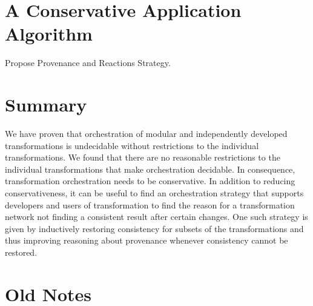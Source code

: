\section{A Conservative Application Algorithm}

Propose Provenance and Reactions Strategy.




\section{Summary}



\begin{insight}[Orchestration]
    We have proven that orchestration of modular and independently developed transformations is undecidable without restrictions to the individual transformations.
    We found that there are no reasonable restrictions to the individual transformations that make orchestration decidable.
    In consequence, transformation orchestration needs to be conservative.
    In addition to reducing conservativeness, it can be useful to find an orchestration strategy that supports developers and users of transformation to find the reason for a transformation network not finding a consistent result after certain changes.
    One such strategy is given by inductively restoring consistency for subsets of the transformations and thus improving reasoning about provenance whenever consistency cannot be restored.
\end{insight}




\section{Old Notes}



